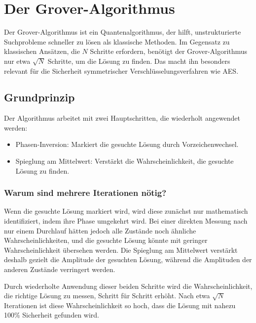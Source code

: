 \section{Der Grover-Algorithmus}
\label{sec:grover}
Der Grover-Algorithmus ist ein Quantenalgorithmus, der hilft, unstrukturierte Suchprobleme schneller zu lösen 
als klassische Methoden. Im Gegensatz zu klassischen Ansätzen, die $N$ Schritte erfordern, benötigt der 
Grover-Algorithmus nur etwa $\sqrt{N}$ Schritte, um die Lösung zu finden. Das macht ihn besonders relevant 
für die Sicherheit symmetrischer Verschlüsselungsverfahren wie AES.

\subsection{Grundprinzip}
Der Algorithmus arbeitet mit zwei Hauptschritten, die wiederholt angewendet werden:
\begin{itemize}
    \item Phasen-Inversion: Markiert die gesuchte Lösung durch Vorzeichenwechsel.
    \item Spieglung am Mittelwert: Verstärkt die Wahrscheinlichkeit, die gesuchte Lösung zu finden.
\end{itemize}

\subsubsection{Warum sind mehrere Iterationen nötig?}
Wenn die gesuchte Lösung markiert wird, wird diese zunächst nur mathematisch identifiziert, indem ihre Phase 
umgekehrt wird. Bei einer direkten Messung nach nur einem Durchlauf hätten jedoch alle Zustände noch ähnliche 
Wahrscheinlichkeiten, und die gesuchte Lösung könnte mit geringer Wahrscheinlichkeit übersehen werden. Die 
Spieglung am Mittelwert verstärkt deshalb gezielt die Amplitude der gesuchten Lösung, während die Amplituden der anderen 
Zustände verringert werden. 

Durch wiederholte Anwendung dieser beiden Schritte wird die Wahrscheinlichkeit, die richtige Lösung zu messen, 
Schritt für Schritt erhöht. Nach etwa $\sqrt{N}$ Iterationen ist diese Wahrscheinlichkeit so hoch, dass die Lösung 
mit nahezu 100\% Sicherheit gefunden wird.

